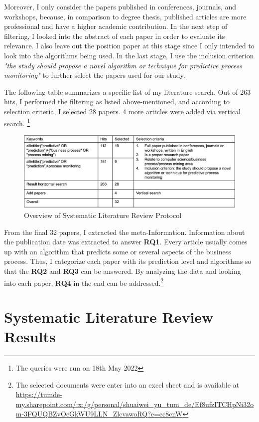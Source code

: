 \documentclass[runningheads]{llncs}
\begin{document}
		Moreover, I only consider the papers published in conferences, journals, and workshops, because, in comparison to degree thesis, published articles are more professional and have a higher academic contribution. In the next step of filtering, I looked into the abstract of each paper in order to evaluate its relevance. I also leave out the position paper at this stage since I only intended to look into the algorithms being used. In the last stage, I use the inclusion criterion \textit{"the study should propose a novel algorithm or technique for predictive process monitoring"} to further select the papers used for our study.
		
		The following table summarizes a specific list of my literature search. Out of 263 hits, I performed the filtering as listed above-mentioned, and according to selection criteria, I selected 28 papers. 4 more articles were added via vertical search. \footnote{The queries were run on 18th May 2022}

		\begin{figure}
		\includegraphics[width=\textwidth]{Filtering.png}
		\caption{Overview of Systematic Literature Review Protocol} 
		\end{figure}
		
		From the final 32 papers, I extracted the meta-Information. Information about the publication date was extracted to answer \textbf{RQ1}. Every article usually comes up with an algorithm that predicts some or several aspects of the business process. Thus, I categorize each paper with its prediction level and algorithms so that the \textbf{RQ2} and \textbf{RQ3} can be answered. By analyzing the data and looking into each paper, \textbf{RQ4} in the end can be addressed.\footnote{The selected documents were enter into an excel sheet and is available at \url{https://tumde-my.sharepoint.com/:x:/g/personal/shuaiwei_yu_tum_de/Ef8ufzITCHpNi32om-3FQUQBZvOeGkWU9LLN_ZlcvawoRQ?e=cc8cnW} }
		
	
	\section{Systematic Literature Review Results}
		
\end{document}
